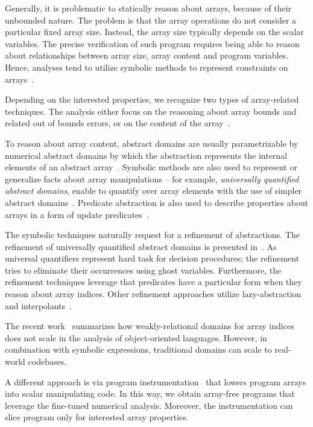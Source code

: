 Generally, it is problematic to statically reason about arrays, because of
their unbounded nature. The problem is that the array operations do not
consider a particular fixed array size. Instead, the array size typically
depends on the scalar variables. The precise verification of such program
requires being able to reason about relationships between array size, array
content and program variables. Hence, analyses tend to utilize symbolic methods
to represent constraints on arrays~\cite{Gopan2005}.

Depending on the interested properties, we recognize two types of array-related
techniques. The analysis either focus on the reasoning about array bounds and
related out of bounds errors, or on the content of the array~\cite{Halbwachs2008}.

To reason about array content, abstract domains are usually para\-me\-tri\-zable by
numerical abstract domains by which the abstraction represents the internal
elements of an abstract array~\cite{Cousot2011p}. Symbolic methods are also
used to represent or generalize facts about array manipulations -- for example,
\emph{universally quantified abstract domains}, enable to quantify over array
elements with the use of simpler abstract domains~\cite{Gulwani2008}.
Predicate abstraction is also used to describe properties about arrays in a
form of update predicates~\cite{Kovacs2009}.

The symbolic techniques naturally request for a refinement of abstractions.
The refinement of universally quantified abstract domains is presented
in~\cite{Seghir2009}.  As universal quantifiers represent hard task for
decision procedures; the refinement tries to eliminate their occurrences using
ghost variables. Furthermore, the refinement techniques leverage that
predicates have a particular form when they reason about array indices. Other
refinement approaches utilize lazy-abstraction~\cite{Alberti2012} and
interpolants~\cite{Alberti2012b}.

The recent work~\cite{Payet2018} summarizes how weakly-relational domains for
array indices does not scale in the analysis of object-oriented languages.
However, in combination with symbolic expressions, traditional domains can
scale to real-world codebases.

A different approach is via program instrumentation~\cite{Cornish2015} that
lowers program arrays into scalar manipulating code. In this way, we obtain
array-free programs that leverage the fine-tuned numerical analysis. Moreover,
the instrumentation can slice program only for interested array properties.

